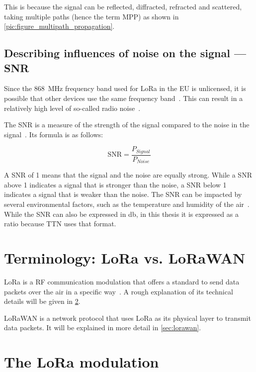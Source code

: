 This is because the signal can be reflected, diffracted, refracted and scattered, taking multiple paths (hence the term \acl{MPP}) as shown in \cref{pic:figure_multipath_propagation}.

\subsection{Describing influences of noise on the signal — \acf{SNR}}\label{sec:background-snr}

Since the \SI{868}{\mega\hertz} frequency band used for \ac{LoRa} in the \ac{EU} is unlicensed, it is possible that other devices use the same frequency band~\cite{etsi_etsi_2012}.
This can result in a relatively high level of so-called radio noise~\cite[p. 6]{fujdiak_insights_2022}.

The \acf{SNR} is a measure of the strength of the signal compared to the noise in the signal~\cite{johnson_signal--noise_2006}.
Its formula is as follows:

\begin{equation}
    \text{SNR} = \frac{P_{Signal}}{P_{Noise}}
\end{equation}

A \ac{SNR} of 1 means that the signal and the noise are equally strong.
While a \ac{SNR} above 1 indicates a signal that is stronger than the noise, a \ac{SNR} below 1 indicates a signal that is weaker than the noise.
The \ac{SNR} can be impacted by several environmental factors, such as the temperature and humidity of the air~\cite{jeftenic_impact_2020}.
While the \ac{SNR} can also be expressed in \si{\decibel}, in this thesis it is expressed as a ratio because \ac{TTN} uses that format.

\section{Terminology: \acs{LoRa} vs. \acs{LoRaWAN}}

\acf{LoRa} is a \ac{RF} communication modulation that offers a standard to send data packets over the air in a specific way~\cite{semtech_corporation_lora_2023}.
A rough explanation of its technical details will be given in \cref{sec:lora-modulation}.

\ac{LoRaWAN} is a network protocol that uses \ac{LoRa} as its physical layer to transmit data packets.
It will be explained in more detail in \cref{sec:lorawan}.

\section{The \acs{LoRa} modulation}\label{sec:lora-modulation}


